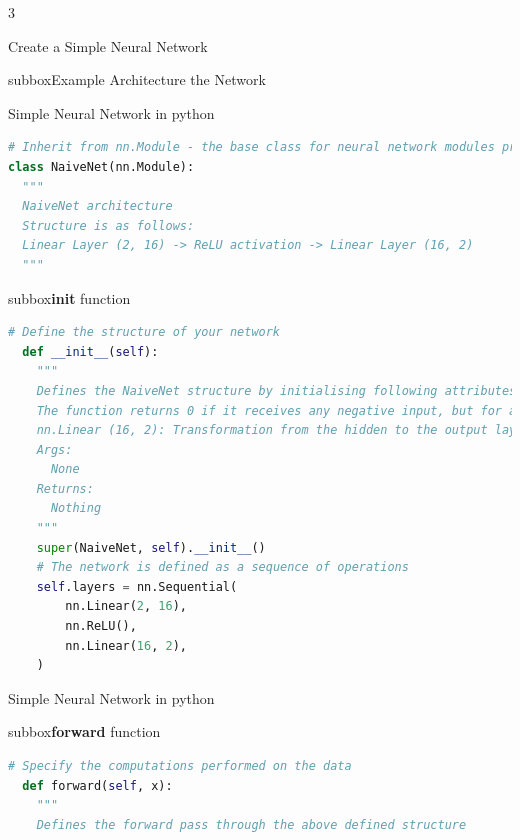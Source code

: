 \begin{multicols}{3}
\begin{textbox}{Create a Simple Neural Network}
\begin{subbox}{subbox}{Example Architecture the Network }
\begin{center}
\end{center}
\end{subbox}
\end{textbox}
\begin{textbox}{Simple Neural Network in python}
\tiny
\begin{lstlisting}[language=Python]
# Inherit from nn.Module - the base class for neural network modules provided by Pytorch
class NaiveNet(nn.Module):
  """
  NaiveNet architecture
  Structure is as follows:
  Linear Layer (2, 16) -> ReLU activation -> Linear Layer (16, 2)
  """
  \end{lstlisting}
\begin{subbox}{subbox}{\textbf{init} function }
\begin{lstlisting}[language=Python]
  # Define the structure of your network
  def __init__(self):
    """
    Defines the NaiveNet structure by initialising following attributes nn.Linear (2, 16):  Transformation from the input to the hidden layer nn.ReLU: Activation function (ReLU) is a non-linearity which is widely used because it reduces computation.
    The function returns 0 if it receives any negative input, but for any positive value x, it returns that value back. 
    nn.Linear (16, 2): Transformation from the hidden to the output layer   
    Args:
      None
    Returns:
      Nothing
    """
    super(NaiveNet, self).__init__()
    # The network is defined as a sequence of operations
    self.layers = nn.Sequential(
        nn.Linear(2, 16),
        nn.ReLU(),
        nn.Linear(16, 2),
    )
\end{lstlisting}
\end{subbox}
\end{textbox}
\begin{textbox}{Simple Neural Network in python}
\tiny
\begin{subbox}{subbox}{\textbf{forward} function }
\begin{lstlisting}[language=Python]
  # Specify the computations performed on the data
  def forward(self, x):
    """
    Defines the forward pass through the above defined structure

\end{lstlisting}
\end{subbox}
\end{textbox}
\end{multicols}
